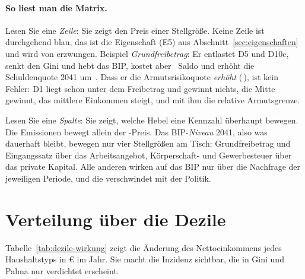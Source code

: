 \begin{table}[p]
\centering\scriptsize
\setlength{\tabcolsep}{3pt}

\caption{Gesamtmatrix der Wirkungen. Die ersten acht Spalten gelten für die erste Periode
(Jahreswerte 2025--2028), die letzten drei für das Ende des Pfads nach fünf Perioden mit
unveränderter Politik. \textcolor{pos}{Blau}: erwünschte Richtung, \textcolor{neg}{orange}:
unerwünschte. Grau: keine messbare Wirkung. Schritte wie in Tabelle~\ref{tab:schritte}.}
\label{tab:gesamt}
\end{table}

\paragraph{So liest man die Matrix.} Lesen Sie eine \emph{Zeile}: Sie zeigt den Preis einer
Stellgröße. Keine Zeile ist durchgehend blau, das ist die Eigenschaft (E5) aus
Abschnitt~\ref{sec:eigenschaften} und wird von  erzwungen. Beispiel
\emph{Grundfreibetrag}: Er entlastet D5 und D10c, senkt den Gini und hebt das BIP, kostet aber
\,\Mrd{} Saldo und erhöht die Schuldenquote 2041 um
\,\Pp. Dass er die Armutsrisikoquote \emph{erhöht}
(\,\Pp), ist kein Fehler: D1 liegt schon unter dem Freibetrag und
gewinnt nichts, die Mitte gewinnt, das mittlere Einkommen steigt, und mit ihm die relative
Armutsgrenze.

Lesen Sie eine \emph{Spalte}: Sie zeigt, welche Hebel eine Kennzahl überhaupt bewegen. Die
Emissionen bewegt allein der \COz-Preis. Das BIP-\emph{Niveau} 2041, also was dauerhaft
bleibt, bewegen nur vier Stellgrößen am Tisch: Grundfreibetrag und Eingangssatz über das
Arbeitsangebot, Körperschaft- und Gewerbesteuer über das private Kapital. Alle anderen wirken
auf das BIP nur über die Nachfrage der jeweiligen Periode, und die verschwindet mit der
Politik.

\section{Verteilung über die Dezile}

Tabelle~\ref{tab:dezile-wirkung} zeigt die Änderung des Nettoeinkommens jedes Haushaltstyps
in \euro{} im Jahr. Sie macht die Inzidenz sichtbar, die in Gini und Palma nur verdichtet
erscheint.

\begin{table}[!htb]
\centering\scriptsize
\setlength{\tabcolsep}{2.5pt}

\caption{Änderung des Nettoeinkommens je Haushalt und Jahr in \euro, erste Periode, je
Schritt. D10a bis D10c teilen das oberste Dezil (90.--95., 95.--99., oberstes Prozent).}
\label{tab:dezile-wirkung}
\end{table}

